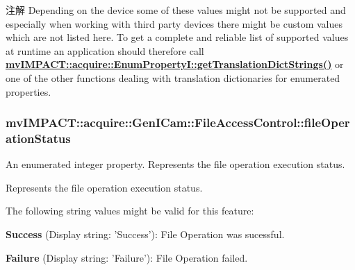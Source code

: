 \begin{DoxyNote}{注解}
Depending on the device some of these values might not be supported and especially when working with third party devices there might be custom values which are not listed here. To get a complete and reliable list of supported values at runtime an application should therefore call {\bfseries \hyperlink{classmv_i_m_p_a_c_t_1_1acquire_1_1_enum_property_i_a0ba6ccbf5ee69784d5d0b537924d26b6}{mv\+I\+M\+P\+A\+C\+T\+::acquire\+::\+Enum\+Property\+I\+::get\+Translation\+Dict\+Strings()}} or one of the other functions dealing with translation dictionaries for enumerated properties. 
\end{DoxyNote}
\hypertarget{classmv_i_m_p_a_c_t_1_1acquire_1_1_gen_i_cam_1_1_file_access_control_a8d7a328ad57ab278a4eb0cd3d7e0856f}{
\subsubsection[{file\+Operation\+Status}]{ mv\+I\+M\+P\+A\+C\+T\+::acquire\+::\+Gen\+I\+Cam\+::\+File\+Access\+Control\+::file\+Operation\+Status}}\label{classmv_i_m_p_a_c_t_1_1acquire_1_1_gen_i_cam_1_1_file_access_control_a8d7a328ad57ab278a4eb0cd3d7e0856f}


An enumerated integer property. Represents the file operation execution status. 

Represents the file operation execution status.

The following string values might be valid for this feature\+:
\begin{DoxyItemize}
\item {\bfseries Success} (Display string\+: 'Success')\+: File Operation was sucessful.
\item {\bfseries Failure} (Display string\+: 'Failure')\+: File Operation failed.
\end{DoxyItemize}

